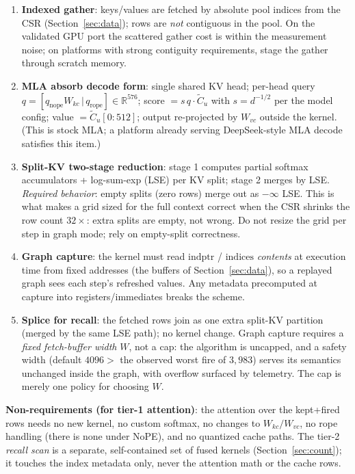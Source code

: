 \documentclass[11pt]{article}
\begin{document}
\begin{enumerate}[itemsep=1pt]
\item \textbf{Indexed gather}: keys/values are fetched by absolute pool
indices from the CSR (Section~\ref{sec:data}); rows are \emph{not}
contiguous in the pool. On the validated GPU port the scattered gather cost
is within the measurement noise; on platforms with strong
contiguity requirements, stage the gather through scratch memory.
\item \textbf{MLA absorb decode form}: single shared KV head; per-head
query $q = [q_{\mathrm{nope}}W_{kc} \,|\, q_{\mathrm{rope}}]
\in \mathbb{R}^{576}$; score $= s\, q \cdot \tilde C_u$ with
$s = d^{-1/2}$ per the model config; value $= \tilde C_u[0{:}512]$;
output re-projected by $W_{vc}$ outside the kernel. (This is stock MLA; a platform
already serving DeepSeek-style MLA decode satisfies this item.)
\item \textbf{Split-KV two-stage reduction}: stage 1 computes partial
softmax accumulators + log-sum-exp (LSE) per KV split; stage 2 merges by
LSE. \emph{Required behavior}: empty splits (zero rows) merge out as
$-\infty$ LSE. This is what makes a grid sized for the full context correct
when the CSR shrinks the row count $32\times$: extra splits are empty, not
wrong. Do not resize the grid per step in graph mode; rely on empty-split
correctness.
\item \textbf{Graph capture}: the kernel must read $\mathrm{indptr}$ /
$\mathrm{indices}$ \emph{contents} at execution time from fixed addresses
(the buffers of Section~\ref{sec:data}), so a replayed graph sees each
step's refreshed values. Any metadata precomputed at capture into
registers/immediates breaks the scheme.
\item \textbf{Splice for recall}: the fetched rows join as one extra
split-KV partition (merged by the same LSE path); no kernel change. Graph capture
requires a \emph{fixed fetch-buffer width} $W$, not a cap: the algorithm is
uncapped, and a safety width (default $4096 >$ the observed worst fire of
$3{,}983$) serves its semantics unchanged inside the graph, with overflow
surfaced by telemetry. The cap is merely one policy for choosing $W$.
\end{enumerate}

\textbf{Non-requirements (for tier-1 attention)}: the attention over the
kept+fired rows needs no new kernel, no custom softmax, no changes to
$W_{kc}/W_{vc}$, no rope handling (there is none under NoPE), and no
quantized cache paths. The tier-2 \emph{recall scan} is a separate,
self-contained set of fused kernels (Section~\ref{sec:count}); it touches
the index metadata only, never the attention math or the cache rows.
\end{document}
